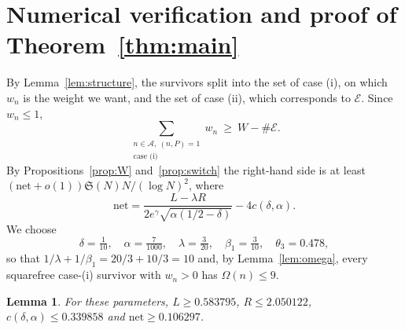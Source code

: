 \documentclass[11pt]{amsart}
\newtheorem{lemma}[theorem]{Lemma}
\theoremstyle{remark}
\newcommand{\cA}{\mathcal{A}}
\newcommand{\cE}{\mathcal{E}}
\newcommand{\Sg}{\mathfrak{S}}
\begin{document}
\section{Numerical verification and proof of Theorem~\ref{thm:main}}\label{sec:numerics}

By Lemma~\ref{lem:structure}, the survivors split into the set of case (i), on which $w_n$ is the weight
we want, and the set of case (ii), which corresponds to $\cE$. Since $w_n\le 1$,
\[
\sum_{\substack{n\in\cA,\ (n,P)=1\\ \text{case (i)}}}w_n\ \ge\ W-\#\cE .
\]
By Propositions~\ref{prop:W} and~\ref{prop:switch} the right-hand side is at least
$(\mathrm{net}+o(1))\Sg(N)N/(\log N)^2$, where
\[
\mathrm{net}=\frac{L-\lambda R}{2e^{\gamma}\sqrt{\alpha(1/2-\delta)}}-4c(\delta,\alpha).
\]
We choose
\[
\delta=\tfrac{1}{10},\quad \alpha=\tfrac{7}{1000},\quad \lambda=\tfrac{3}{20},\quad \beta_1=\tfrac{3}{10},
\quad \theta_3=0.478,
\]
so that $1/\lambda+1/\beta_1=20/3+10/3=10$ and, by Lemma~\ref{lem:omega}, every squarefree case-(i)
survivor with $w_n>0$ has $\Omega(n)\le 9$.

\begin{lemma}\label{lem:numerics}
For these parameters, $L\ge 0.583795$, $R\le 2.050122$, $c(\delta,\alpha)\le 0.339858$ and
$\mathrm{net}\ge 0.106297$.
\end{lemma}
\end{document}
